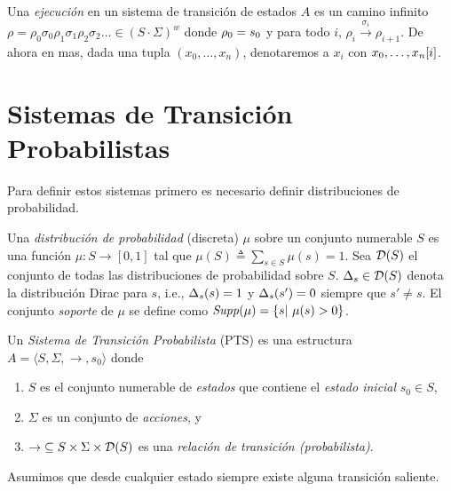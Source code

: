 Una \emph{ejecución} en un sistema de transición de estados $A$ es un camino infinito $\rho = \rho_0 \sigma_0 \rho_1 \sigma_1  \rho_2 \sigma_2 \dots \in (S \cdot \Sigma)^{w}$ 
donde $\rho_0 = \InitState$ y para todo $i$, $\rho_i \xrightarrow{\sigma_i} \rho_{i+1}$. De ahora en mas, dada una tupla $(x_0,\dots,x_n)$, denotaremos a $x_i$ con  $\pr{i}{x_0,\dots,x_n}$.



\section{Sistemas de Transición Probabilistas} 

Para definir estos sistemas primero es necesario definir distribuciones de probabilidad.

Una \emph{distribución de probabilidad} (discreta) $\mu$ sobre un conjunto numerable $S$ es una función $\mu: S \rightarrow [0, 1] $  tal que $\mu(S) \triangleq \sum_{s \in S} \mu(s) = 1$. 
Sea $\Dist(S)$ el conjunto de todas las distribuciones de probabilidad sobre $S$. $\Dirac_s \in \Dist(S)$ denota la distribución Dirac para $s$, i.e., $\Dirac_s(s) =1$ y $\Dirac_s(s') = 0$ siempre que $s'\neq s$.
El conjunto \textit{soporte} de $\mu$ se define como $\support{\mu} = \{s |~\mu (s) > 0\}$.


Un \emph{Sistema de Transición Probabilista} (PTS) es una estructura $A = \langle S, \Sigma, \rightarrow, s_0 \rangle$ 
donde 
\begin{enumerate}
\item%
  $S$ es el conjunto numerable de \emph{estados} que contiene el
  \emph{estado inicial} $s_0 \in S$,
\item%
  $\Sigma$ es un conjunto de \emph{acciones}, y
\item%
  ${\rightarrow} \subseteq S \times \Sigma \times \Dist(S)$ es una
  \emph{relación de transición (probabilista)}.
\end{enumerate}
Asumimos que desde cualquier estado siempre existe alguna transición saliente.

